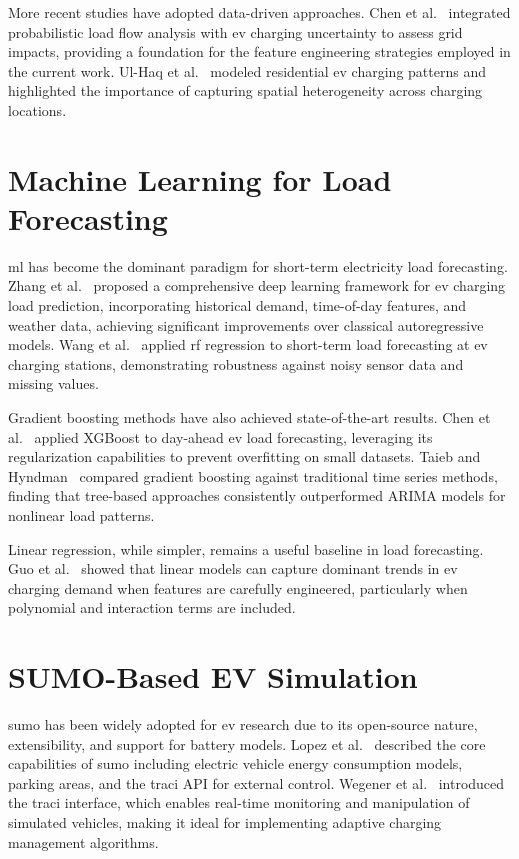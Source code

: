 \documentclass{thesis-library}
\begin{document}
More recent studies have adopted data-driven approaches. Chen et
al.~\cite{featurengineering_ev2022} integrated probabilistic load flow analysis with
\Gls{ev} charging uncertainty to assess grid impacts, providing a foundation for the
feature engineering strategies employed in the current work. Ul-Haq et
al.~\cite{parking_area_ev2022} modeled residential \Gls{ev} charging patterns and
highlighted the importance of capturing spatial heterogeneity across charging locations.

\section{Machine Learning for Load Forecasting}

\Gls{ml} has become the dominant paradigm for short-term electricity load forecasting.
Zhang et al.~\cite{ml_ev_load2021} proposed a comprehensive deep learning framework for
\Gls{ev} charging load prediction, incorporating historical demand, time-of-day features,
and weather data, achieving significant improvements over classical autoregressive models.
Wang et al.~\cite{rf_load_forecast2020} applied \Gls{rf} regression to short-term load
forecasting at \Gls{ev} charging stations, demonstrating robustness against noisy sensor
data and missing values.

Gradient boosting methods have also achieved state-of-the-art results. Chen et
al.~\cite{xgboost_energy2022} applied XGBoost to day-ahead \Gls{ev} load forecasting,
leveraging its regularization capabilities to prevent overfitting on small datasets.
Taieb and Hyndman~\cite{decision_tree_load2019} compared gradient boosting against
traditional time series methods, finding that tree-based approaches consistently
outperformed ARIMA models for nonlinear load patterns.

Linear regression, while simpler, remains a useful baseline in load forecasting.
Guo et al.~\cite{regression_ev2020} showed that linear models can capture dominant
trends in \Gls{ev} charging demand when features are carefully engineered, particularly
when polynomial and interaction terms are included.

\section{SUMO-Based EV Simulation}

\Gls{sumo} has been widely adopted for \Gls{ev} research due to its open-source nature,
extensibility, and support for battery models. Lopez et al.~\cite{sumo2018} described the
core capabilities of \Gls{sumo} including electric vehicle energy consumption models,
parking areas, and the \Gls{traci} API for external control. Wegener et
al.~\cite{traci2012} introduced the \Gls{traci} interface, which enables real-time
monitoring and manipulation of simulated vehicles, making it ideal for implementing
adaptive charging management algorithms.
\end{document}
